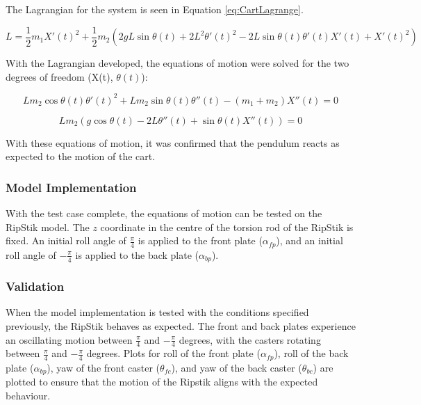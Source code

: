 The Lagrangian for the system is seen in Equation \ref{eq:CartLagrange}.

\begin{equation}
\label{eq:CartLagrange}
L = \frac{1}{2}m_{1}X'(t)^2+\frac{1}{2}m_{2}(2gL\sin\theta(t)+2L^2\theta'(t)^2-2L\sin\theta(t)\theta'(t)X'(t)+X'(t)^2) 
\end{equation}

With the Lagrangian developed, the equations of motion were solved for the two degrees of freedom (X(t), $\theta(t)$):

\begin{equation}
Lm_{2}\cos\theta(t)\theta'(t)^2+Lm_{2}\sin\theta(t)\theta''(t)-(m_{1}+m_{2})X''(t) = 0
\end{equation}

\begin{equation}
Lm_{2}(g\cos\theta(t)-2L\theta''(t)+\sin\theta(t)X''(t)) = 0
\end{equation}

With these equations of motion, it was confirmed that the pendulum reacts as expected to the motion of the cart.

\subsubsection{Model Implementation}

With the test case complete, the equations of motion can be tested on the RipStik model. The $z$ coordinate in the centre of the torsion rod of the RipStik is fixed.
An initial roll angle of $\frac{\pi}{4}$ is applied to the front plate ($\alpha_{fp}$), and an initial roll angle of $-\frac{\pi}{4}$ is applied to the back plate ($\alpha_{bp}$). 

\subsubsection{Validation}

When the model implementation is tested with the conditions specified previously, the RipStik behaves as expected. 
The front and back plates experience an oscillating motion between $\frac{\pi}{4}$ and $-\frac{\pi}{4}$ degrees, with the casters rotating between $\frac{\pi}{4}$ and $-\frac{\pi}{4}$ degrees. 
Plots for roll of the front plate ($\alpha_{fp}$), roll of the back plate ($\alpha_{bp}$), yaw of the front caster ($\theta_{fc}$), and yaw of the back caster ($\theta_{bc}$) are plotted to ensure that the motion of the Ripstik aligns with the expected behaviour.

